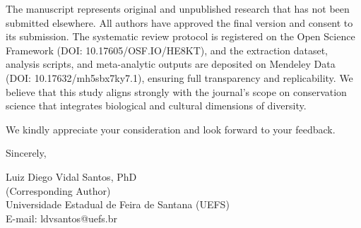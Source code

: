 \documentclass[12pt]{article}
\begin{document}
\vspace{6pt}

\noindent
The manuscript represents original and unpublished research that has not been submitted elsewhere. All authors have approved the final version and consent to its submission. The systematic review protocol is registered on the Open Science Framework (DOI: 10.17605/OSF.IO/HE8KT), and the extraction dataset, analysis scripts, and meta-analytic outputs are deposited on Mendeley Data (DOI: 10.17632/mh5sbx7ky7.1), ensuring full transparency and replicability. We believe that this study aligns strongly with the journal's scope on conservation science that integrates biological and cultural dimensions of diversity.

\vspace{6pt}

\noindent
We kindly appreciate your consideration and look forward to your feedback.

\vspace{36pt}

\noindent
Sincerely,

\vspace{36pt}

\noindent
Luiz Diego Vidal Santos, PhD\\
(Corresponding Author)\\
Universidade Estadual de Feira de Santana (UEFS)\\
E-mail: ldvsantos@uefs.br
\end{document}
